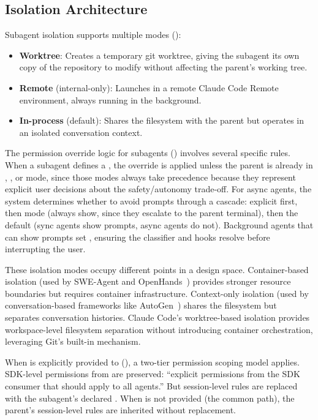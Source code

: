 \subsection{Isolation Architecture}
\label{sec:subagent:isolation}

Subagent isolation supports multiple modes ():

\begin{itemize}[nosep]
  \item \textbf{Worktree}: Creates a temporary git worktree, giving the subagent its own copy of the repository to modify without affecting the parent's working tree.
  \item \textbf{Remote} (internal-only): Launches in a remote Claude Code Remote environment, always running in the background.
  \item \textbf{In-process} (default): Shares the filesystem with the parent but operates in an isolated conversation context.
\end{itemize}

The permission override logic for subagents () involves several specific rules. When a subagent defines a , the override is applied unless the parent is already in , , or  mode, since those modes always take precedence because they represent explicit user decisions about the safety/autonomy trade-off. For async agents, the system determines whether to avoid prompts through a cascade: explicit  first, then  mode (always show, since they escalate to the parent terminal), then the default (sync agents show prompts, async agents do not). Background agents that can show prompts set , ensuring the classifier and hooks resolve before interrupting the user.

These isolation modes occupy different points in a design space. Container-based isolation (used by SWE-Agent and OpenHands~\citep{yang2024sweagent,wang2024openhands}) provides stronger resource boundaries but requires container infrastructure. Context-only isolation (used by conversation-based frameworks like AutoGen~\citep{wu2024autogen}) shares the filesystem but separates conversation histories. Claude Code's worktree-based isolation provides workspace-level filesystem separation without introducing container orchestration, leveraging Git's built-in mechanism.

When  is explicitly provided to  (), a two-tier permission scoping model applies. SDK-level permissions from  are preserved: ``explicit permissions from the SDK consumer that should apply to all agents.'' But session-level rules are replaced with the subagent's declared . When  is not provided (the common  path), the parent's session-level rules are inherited without replacement.

